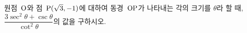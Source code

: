원점~$\mathrm{O}$와 점~$\mathrm{P}(\sqrt{3}{,}\mkern3mu\mathopen{}-1)$에 대하여 동경~$\mathrm{OP}$가 나타내는 각의 크기를 $\theta$라 할 때, $\dfrac{3\sec^2\theta+\csc\theta}{\cot^2\theta}$의 값을 구하시오.
